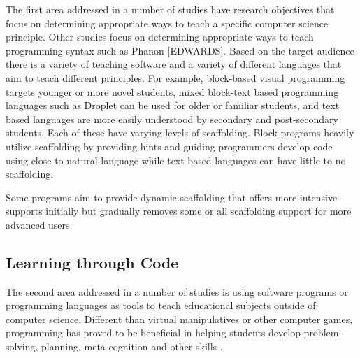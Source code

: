 The first area addressed in a number of studies have research objectives that focus on determining appropriate ways to teach a specific computer science principle.
Other studies focus on determining appropriate ways to teach programming syntax such as Phanon [EDWARDS].
Based on the target audience there is a variety of teaching software and a variety of different languages that aim to teach different principles.
For example, block-based visual programming targets younger or more novel students, mixed block-text based programming languages such as Droplet can be used for older or familiar students, and text based languages are more easily understood by secondary and post-secondary students.
Each of these have varying levels of scaffolding.
Block programs heavily utilize scaffolding by providing hints and guiding programmers develop code using close to natural language while text based languages can have little to no scaffolding.

Some programs aim to provide dynamic scaffolding that offers more intensive supports initially but gradually removes some or all scaffolding support for more advanced users.
    
\subsection*{Learning through Code}
The second area addressed in a number of studies is using software programs or programming languages as tools to teach educational subjects outside of computer science.
Different than virtual manipulatives or other computer games, programming has proved to be beneficial in helping students develop problem-solving, planning, meta-cognition and other skills \cite{papadakis, fuchs}.



